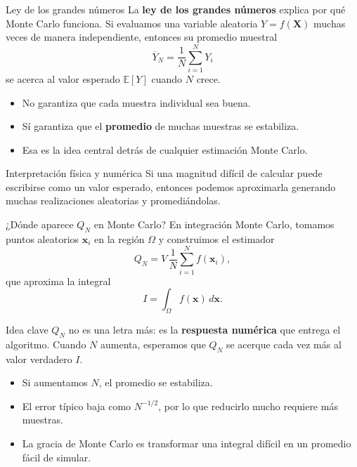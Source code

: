 \begin{frame}{Ley de los grandes números}
\justifying
La \textbf{ley de los grandes números} explica por qué Monte Carlo funciona.
Si evaluamos una variable aleatoria $Y=f(\bm{X})$ muchas veces de manera
independiente, entonces su promedio muestral
\begin{equation*}
\overline{Y}_N = \frac{1}{N}\sum_{i=1}^{N} Y_i
\end{equation*}
se acerca al valor esperado $\mathbb{E}[Y]$ cuando $N$ crece.

\begin{itemize}
    \item No garantiza que cada muestra individual sea buena.
    \item Sí garantiza que el \textbf{promedio} de muchas muestras se estabiliza.
    \item Esa es la idea central detrás de cualquier estimación Monte Carlo.
\end{itemize}

\begin{alertblock}{Interpretación física y numérica}
Si una magnitud difícil de calcular puede escribirse como un valor esperado,
entonces podemos aproximarla generando muchas realizaciones aleatorias y
promediándolas.
\end{alertblock}
\end{frame}

\begin{frame}{¿Dónde aparece $Q_N$ en Monte Carlo?}
\small
\justifying
En integración Monte Carlo, tomamos puntos aleatorios $\bm{x}_i$ en la región
$\Omega$ y construimos el estimador
\begin{equation*}
Q_N = V\,\frac{1}{N}\sum_{i=1}^{N} f(\bm{x}_i),
\end{equation*}
que aproxima la integral
\begin{equation*}
I = \int_{\Omega} f(\bm{x})\,d\bm{x}.
\end{equation*}

\begin{block}{Idea clave}
$Q_N$ no es una letra más: es la \textbf{respuesta numérica} que entrega el
algoritmo. Cuando $N$ aumenta, esperamos que $Q_N$ se acerque cada vez más al
valor verdadero $I$.
\end{block}

\begin{itemize}
    \setlength\itemsep{0.2em}
    \item Si aumentamos $N$, el promedio se estabiliza.
    \item El error típico baja como $N^{-1/2}$, por lo que reducirlo mucho requiere más muestras.
    \item La gracia de Monte Carlo es transformar una integral difícil en un promedio fácil de simular.
\end{itemize}
\end{frame}

